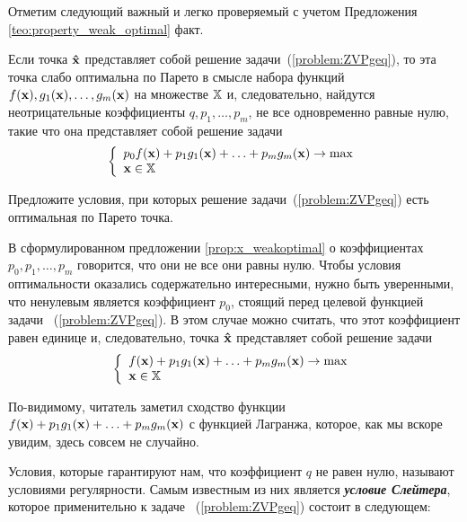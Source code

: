 Отметим следующий важный и легко проверяемый с учетом Предложения
\ref{teo:property_weak_optimal} факт.

\begin{prop}\label{prop:x_weakoptimal}
Если точка $\mathbf{\hat x}$ представляет собой решение
задачи~(\ref{problem:ZVPgeq}), то эта точка слабо оптимальна по
Парето в смысле набора функций $f(\mathbf{x}), g_1(\mathbf{x}), \ldots,
g_m(\mathbf{x})$ на множестве $\mathbb{X}$ и, следовательно, найдутся
неотрицательные коэффициенты $q, p_1, \ldots, p_m$, не все
одновременно равные нулю, такие что она представляет собой решение
задачи
\[
\left\{ \begin{array}{l}
 p_{0} f(\mathbf{x}) + p_1 g_1(\mathbf{x})+ \ldots + p_m g_m(\mathbf{x}) \to \max  \\
 \mathbf{x} \in \mathbb{X} \\
 \end{array} \right.
\]
\end{prop}


\begin{exer}
Предложите условия, при которых решение
задачи~(\ref{problem:ZVPgeq}) есть оптимальная по Парето точка.
\end{exer}

    В сформулированном предложении \ref{prop:x_weakoptimal} о коэффициентах
    $p_{0}, p_1, \ldots, p_m$ говорится, что они не все они равны нулю.
    Чтобы условия оптимальности оказались  содержательно
    интересными, нужно быть уверенными, что ненулевым является
    коэффициент $p_{0}$, стоящий перед целевой функцией задачи
    ~(\ref{problem:ZVPgeq}). В этом случае можно считать, что этот
    коэффициент равен единице и, следовательно, точка $\mathbf{\hat x}$
    представляет собой решение задачи
\[
\left\{ \begin{array}{l}
 f(\mathbf{x}) + p_1 g_1(\mathbf{x})+ \ldots + p_m g_m(\mathbf{x}) \to \max  \\
 \mathbf{x} \in \mathbb{X} \\
 \end{array} \right.
\]

    По-видимому, читатель заметил сходство функции
    $f(\mathbf{x}) + p_1 g_1(\mathbf{x})+ \ldots + p_m g_m(\mathbf{x})$
    с функцией Лагранжа, которое, как мы вскоре увидим, здесь совсем не случайно.

    Условия, которые гарантируют нам, что коэффициент $q$ не равен
    нулю, называют условиями регулярности. Самым известным из них
    является \emph{\textbf{условие Слейтера}}, которое применительно
    к задаче ~(\ref{problem:ZVPgeq}) состоит в следующем:

